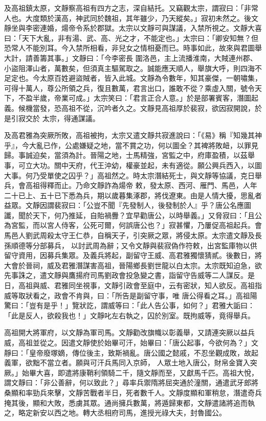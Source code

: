 \begin{pinyinscope}
 及高祖鎮太原，文靜察高祖有四方之志，深自結托。又竊觀太宗，謂寂曰：「非常人也。大度類於漢高，神武同於魏祖，其年雖少，乃天縱矣。」寂初未然之。後文靜坐與李密連婚，煬帝令系於郡獄。太宗以文靜可與謀議，入禁所視之。文靜大喜曰：「天下大亂，非有湯、武、高、光之才，不能定也。」太宗曰：「卿安知無？但恐常人不能別耳。今入禁所相看，非兒女之情相憂而已。時事如此，故來與君圖舉大計，請善籌其事。」文靜曰：「今李密長
 圍洛邑，主上流播淮南，大賊連州郡、小盜阻澤山者，萬數矣，但須真主驅駕取之。誠能應天順人，舉旗大呼，則四海不足定也。今太原百姓避盜賊者，皆入此城。文靜為令數年，知其豪傑，一朝嘯集，可得十萬人，尊公所領之兵，復且數萬，君言出口，誰敢不從？乘虛入關，號令天下，不盈半歲，帝業可成。」太宗笑曰：「君言正合人意。」於是部署賓客，潛圖起義。候機當發，恐高祖不從，沉吟者久之。文靜見高祖厚於裴寂，欲因寂開說，於是引寂交於
 太宗，得通謀議。



 及高君雅為突厥所敗，高祖被拘，太宗又遣文靜共寂進說曰：「《易》稱『知幾其神乎』，今大亂已作，公處嫌疑之地，當不賞之功，何以圖全？其裨將敗衄，以罪見歸。事誠迫矣，當須為計。晉陽之地，士馬精強，宮監之中，府庫盈積，以茲舉事，可立大功。關中天府，代王沖幼，權豪並起，未有適從。願公興兵西入，以圖大事。何乃受單使之囚乎？」高祖然之。時太宗潛結死士，與文靜等協議，克日舉兵，會高祖得釋而止。乃命文靜詐為煬帝
 敕，發太原、西河、雁門、馬邑，人年二十已上、五十已下悉為兵，期以歲暮集涿郡，將伐遼東。由是人情大擾，思亂者益眾。文靜因謂裴寂曰：「公豈不聞『先發制人，後發制於人』乎？唐公名應圖讖，聞於天下，何乃推延，自貽禍釁？宜早勸唐公，以時舉義。」又脅寂曰：「且公為宮監，而以宮人侍客，公死可爾，何誤唐公也？」寂甚懼，乃屢促高祖起兵。會馬邑人劉武周殺太守王仁恭，自稱天子，引突厥之眾，將侵太原。太宗遣文靜及長孫順德等分部募兵，
 以討武周為辭；又令文靜與裴寂偽作符敕，出宮監庫物以供留守資用，因募兵集眾。及義兵將起，副留守王威、高君雅獨懷猜貳。後數日，將大會於晉祠，威及君雅潛謀害高祖，晉陽鄉長劉世龍以白太宗。太宗既知迫急，欲先事誅之，遣文靜與鷹揚府司馬劉政會投急變之書，詣留守告威等二人謀反。是日，高祖與威、君雅同坐視事，文靜引政會至庭中，云有密狀，知人欲反。高祖指威等取狀看之，政會不肯與，曰：「所告是副留守事，唯
 唐公得看之耳。」高祖陽驚曰：「豈有是乎！」覽狀訖，謂威等曰：「此人告公事，如何？」君雅大詬曰：「此是反人，欲殺我也！」文靜叱左右執之，囚於別室。既拘威等，竟得舉兵。



 高祖開大將軍府，以文靜為軍司馬。文靜勸改旗幟以彰義舉，又請連突厥以益兵威，高祖並從之。因遣文靜使於始畢可汗，始畢曰：「唐公起事，今欲何為？」文靜曰：「皇帝廢塚嫡，傳位後主，致斯禍亂。唐公國之懿戚，不忍坐觀成敗，故起義軍，欲黜不當立者。願與可汗兵馬同入京師，
 人眾土地入唐公，財帛金寶入突厥。」始畢大喜，即遣將康鞘利領騎二千，隨文靜而至，又獻馬千匹。高祖大悅，謂文靜曰：「非公善辭，何以致此？」尋率兵禦隋將屈突通於潼關，通遣武牙郎將桑顯和率勁兵來擊，文靜苦戰者半日，死者數千人。文靜度顯和軍稍怠，潛遣奇兵掩其後，顯和大敗，悉虜其眾。通尚擁兵數萬，將遁歸東都，文靜遣諸將追而執之，略定新安以西之地。轉大丞相府司馬，進授光祿大夫，封魯國公。




\end{pinyinscope}
